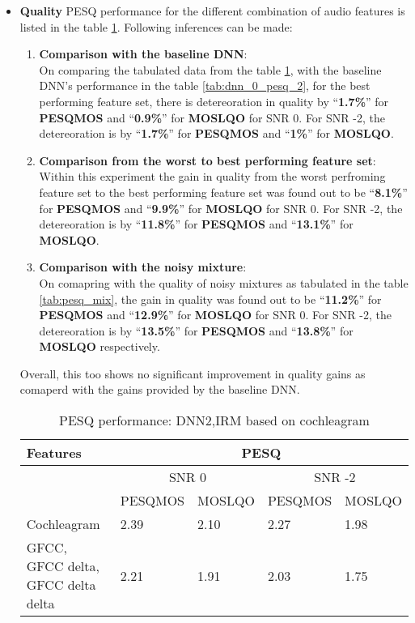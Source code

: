 \begin{enumerate}
\begin{itemize}
\item \textbf{Quality}
PESQ performance for the different combination of audio features is listed in the table \ref{tab:dnn_1_pesq_2}. Following inferences can be made:\\
\begin{enumerate}
\item \textbf{Comparison with the baseline DNN}:\\
On comparing the tabulated data from the table \ref{tab:dnn_1_pesq_2}, with the baseline DNN's performance in the table \ref{tab:dnn_0_pesq_2}, for the best performing feature set, there is detereoration in quality by \enquote{\textbf{1.7\%}} for \textbf{PESQMOS} and \enquote{\textbf{0.9\%}} for \textbf{MOSLQO} for SNR 0. For SNR -2, the detereoration is by \enquote{\textbf{1.7\%}} for \textbf{PESQMOS} and \enquote{\textbf{1\%}} for \textbf{MOSLQO}.
\item \textbf{Comparison from the worst to best performing feature set}:\\
Within this experiment the gain in quality from the worst perfroming feature set to the best performing feature set was found out to be \enquote{\textbf{8.1\%}} for \textbf{PESQMOS} and \enquote{\textbf{9.9\%}} for \textbf{MOSLQO} for SNR 0. For SNR -2, the detereoration is by \enquote{\textbf{11.8\%}} for \textbf{PESQMOS} and \enquote{\textbf{13.1\%}} for \textbf{MOSLQO}.
\item \textbf{Comparison with the noisy mixture}:\\
On comapring with the quality of noisy mixtures as tabulated in the table \ref{tab:pesq_mix}, the gain in quality was found out to be \enquote{\textbf{11.2\%}} for \textbf{PESQMOS} and \enquote{\textbf{12.9\%}} for \textbf{MOSLQO} for SNR 0. For SNR -2, the detereoration is by \enquote{\textbf{13.5\%}} for \textbf{PESQMOS} and \enquote{\textbf{13.8\%}} for \textbf{MOSLQO} respectively.
\end{enumerate}
Overall, this too shows no significant improvement in quality gains as comaperd with the gains provided by the baseline DNN.
\begin{table}[!htbp]
\centering
\begin{tabular}{ |p{8cm}|p{1.7cm}|p{1.7cm}|p{1.7cm}|p{1.7cm}|  }
\hline
\textbf{Features} & \multicolumn{4}{|c|}{\textbf{PESQ}}\\
\hline
\cellcolor{black} & \multicolumn{2}{|c|}{SNR 0} & \multicolumn{2}{|c|}{SNR -2}\\
\hline
\cellcolor{black} & PESQMOS & MOSLQO & PESQMOS & MOSLQO\\
\hline
\cellcolor[HTML]{ADD8E6}Cochleagram	& \cellcolor[HTML]{ADD8E6}2.39	& \cellcolor[HTML]{ADD8E6}2.10	& \cellcolor{yellow}2.27	& \cellcolor{yellow}1.98\\
\hline
GFCC, GFCC delta, GFCC delta delta & 2.21	& 1.91	& 2.03	& 1.75\\
\hline
\end{tabular}
\caption{PESQ performance: DNN2,IRM based on cochleagram}
\label{tab:dnn_1_pesq_2}
\end{table}
\end{itemize}
\end{enumerate}
